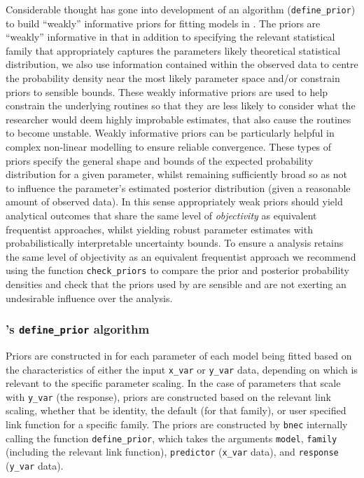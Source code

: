 \documentclass[
]{jss}
\begin{document}
Considerable thought has gone into development of an algorithm
(\texttt{define\_prior}) to build ``weakly'' informative priors for
fitting models in . The priors are ``weakly'' informative
in that in addition to specifying the relevant statistical family that
appropriately captures the parameters likely theoretical statistical
distribution, we also use information contained within the observed data
to centre the probability density near the most likely parameter space
and/or constrain priors to sensible bounds. These weakly informative
priors are used to help constrain the underlying routines so that they
are less likely to consider what the researcher would deem highly
improbable estimates, that also cause the routines to become unstable.
Weakly informative priors can be particularly helpful in complex
non-linear modelling to ensure reliable convergence. These types of
priors specify the general shape and bounds of the expected probability
distribution for a given parameter, whilst remaining sufficiently broad
so as not to influence the parameter's estimated posterior distribution
(given a reasonable amount of observed data). In this sense
appropriately weak priors should yield analytical outcomes that share
the same level of \emph{objectivity} as equivalent frequentist
approaches, whilst yielding robust parameter estimates with
probabilistically interpretable uncertainty bounds. To ensure a
 analysis retains the same level of objectivity as an
equivalent frequentist approach we recommend using the function
\texttt{check\_priors} to compare the prior and posterior probability
densities and check that the priors used by  are sensible
and are not exerting an undesirable influence over the analysis.

\subsubsection[bayesnec's define_prior algorithm]{'s
\texttt{define\_prior} algorithm}\label{s-define_prior-algorithm}

Priors are constructed in  for each parameter of each
model being fitted based on the characteristics of either the input
\texttt{x\_var} or \texttt{y\_var} data, depending on which is relevant
to the specific parameter scaling. In the case of parameters that scale
with \texttt{y\_var} (the response), priors are constructed based on the
relevant link scaling, whether that be identity, the default (for that
family), or user specified link function for a specific family. The
priors are constructed by \texttt{bnec} internally calling the function
\texttt{define\_prior}, which takes the arguments \texttt{model},
\texttt{family} (including the relevant link function),
\texttt{predictor} (\texttt{x\_var} data), and \texttt{response}
(\texttt{y\_var} data).
\end{document}
